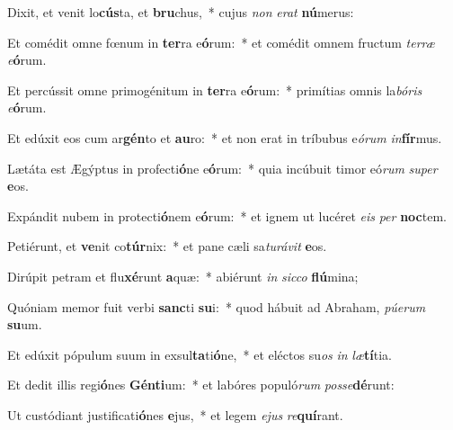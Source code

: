 \item Dixit, et venit lo\textbf{cús}ta, et \textbf{bru}chus,~* cujus \textit{non} \textit{e}\textit{rat} \textbf{nú}merus:
\item Et comédit omne fœnum in \textbf{ter}ra e\textbf{ó}rum:~* et comédit omnem fructum \textit{ter}\textit{ræ} \textit{e}\textbf{ó}rum.
\item Et percússit omne primogénitum in \textbf{ter}ra e\textbf{ó}rum:~* primítias omnis la\textit{bó}\textit{ris} \textit{e}\textbf{ó}rum.
\item Et edúxit eos cum ar\textbf{gén}to et \textbf{au}ro:~* et non erat in tríbubus e\textit{ó}\textit{rum} \textit{in}\textbf{fír}mus.
\item Lætáta est Ægýptus in profecti\textbf{ó}ne e\textbf{ó}rum:~* quia incúbuit timor eó\textit{rum} \textit{su}\textit{per} \textbf{e}os.
\item Expándit nubem in protecti\textbf{ó}nem e\textbf{ó}rum:~* et ignem ut lucéret \textit{e}\textit{is} \textit{per} \textbf{noc}tem.
\item Petiérunt, et \textbf{ve}nit co\textbf{túr}nix:~* et pane cæli sa\textit{tu}\textit{rá}\textit{vit} \textbf{e}os.
\item Dirúpit petram et flu\textbf{xé}runt \textbf{a}quæ:~* abiérunt \textit{in} \textit{sic}\textit{co} \textbf{flú}mina;
\item Quóniam memor fuit verbi \textbf{sanc}ti \textbf{su}i:~* quod hábuit ad Abraham, \textit{pú}\textit{e}\textit{rum} \textbf{su}um.
\item Et edúxit pópulum suum in exsul\textbf{ta}ti\textbf{ó}ne,~* et eléctos su\textit{os} \textit{in} \textit{læ}\textbf{tí}tia.
\item Et dedit illis regi\textbf{ó}nes \textbf{Gén}\textbf{ti}um:~* et labóres populó\textit{rum} \textit{pos}\textit{se}\textbf{dé}runt:
\item Ut custódiant justificati\textbf{ó}nes \textbf{e}jus,~* et legem \textit{e}\textit{jus} \textit{re}\textbf{quí}rant.
